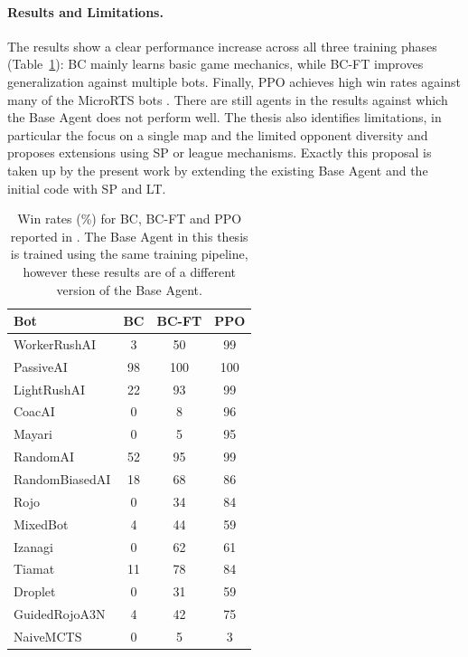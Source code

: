 \documentclass[10pt,twocolumn,letterpaper]{article}
\begin{document}
\paragraph{Results and Limitations.}
The results show a clear performance increase across all three training phases (Table~\ref{tab:win rates_all}): BC mainly learns basic game mechanics, while BC-FT improves generalization against multiple bots.
Finally, PPO achieves high win rates against many of the MicroRTS bots \cite{huft2023microrts}.
There are still agents in the results against which the Base Agent does not perform well. 
The thesis also identifies limitations, in particular the focus on a single map and the limited opponent diversity and proposes extensions using SP or league mechanisms. 
Exactly this proposal is taken up by the present work by extending the existing Base Agent and the initial code with SP and LT.
\begin{table}[ht]
\centering
\caption{Win rates (\%) for BC, BC-FT and PPO reported in \cite{huft2023microrts}. The Base Agent in this thesis is trained using the same training pipeline, however these results are of a different version of the Base Agent.}
\label{tab:win rates_all}
\begin{tabular}{lccc}
\hline
\textbf{Bot} & \textbf{BC} & \textbf{BC-FT} & \textbf{PPO} \\
\hline
WorkerRushAI     & 3 & 50 & 99 \\
PassiveAI        & 98& 100& 100 \\
LightRushAI      & 22 & 93 & 99 \\
CoacAI           & 0 & 8 & 96 \\
Mayari           & 0 & 5 & 95 \\
RandomAI         & 52 & 95 & 99\\
RandomBiasedAI   & 18 & 68 & 86\\
Rojo             & 0 & 34& 84 \\
MixedBot         & 4 & 44 & 59 \\
Izanagi          & 0& 62& 61\\
Tiamat           & 11 & 78& 84 \\
Droplet          & 0& 31& 59\\
GuidedRojoA3N    & 4 & 42& 75 \\
NaiveMCTS        & 0 & 5& 3 \\
\hline
\end{tabular}
\end{table}
\vspace{10pt}
\end{document}
